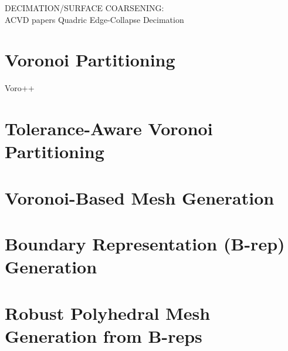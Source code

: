 DECIMATION/SURFACE COARSENING:\\
ACVD papers
Quadric Edge-Collapse Decimation

\section{Voronoi Partitioning}
\label{Voronoi Partitioning}
Voro++

\section{Tolerance-Aware Voronoi Partitioning}
\label{Tolerance-Aware Voronoi Partitioning}
\section{Voronoi-Based Mesh Generation}
\label{Voronoi-Based Mesh Generation}
\section{Boundary Representation (B-rep) Generation}
\label{Boundary Representation (B-rep) Generation}
\section{Robust Polyhedral Mesh Generation from B-reps}
\label{Robust Polyhedral Mesh Generation from B-reps}
